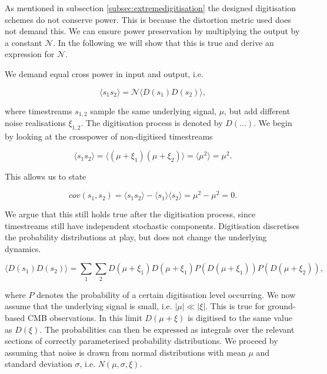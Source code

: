 \documentclass[apj]{emulateapj}
\begin{document}
As mentioned in subsection \ref{subsec:extremedigitisation} the designed digitisation schemes do not conserve power. This is because the distortion metric used does not demand this. We can ensure power preservation by multiplying the output by a constant $\mathcal{N}$. In the following we will show that this is true and derive an expression for $\mathcal{N}$.

We demand equal cross power in input and output, i.e.

\begin{equation} \label{eq:normcrosspower}
\langle s_1 s_2 \rangle = \mathcal{N} \langle D(s_1) D(s_2) \rangle,
\end{equation}

where timestreams $s_{1,2}$ sample the same underlying signal, $\mu$, but add different noise realisations $\xi_{1, 2}$. The digitisation process is denoted by $D(\dots)$. We begin by looking at the crosspower of non-digitised timestreams

\begin{equation}
\langle s_1 s_2 \rangle = \langle (\mu + \xi_1) (\mu + \xi_2) \rangle =  \langle \mu^2 \rangle = \mu^2.
\end{equation}

This allows us to state

\begin{equation}
cov(s_1, s_2) = \langle s_1 s_2 \rangle - \langle s_1 \rangle \langle s_2 \rangle = \mu^2 - \mu^2 = 0.
\end{equation}

We argue that this still holds true after the digitisation process, since timestreams still have independent stochastic components. Digitisation discretises the probability distributions at play, but does not change the underlying dynamics.

\begin{equation}
\langle D(s_1) D(s_2) \rangle = \sum_1 \sum_2 D(\mu + \xi_1) D(\mu + \xi_1) P(D(\mu + \xi_1)) P(D(\mu + \xi_2)),
\end{equation}

where $P$ denotes the probability of a certain digitisation level occurring. We now assume that the underlying signal is small, i.e. $| \mu | \ll | \xi |$. This is true for ground-based CMB observations. In this limit $D(\mu + \xi)$ is digitised to the same value as $D(\xi)$. The probabilities can then be expressed as integrals over the relevant sections of correctly parameterised probability distributions. We proceed by assuming that noise is drawn from normal distributions with mean $\mu$ and standard deviation $\sigma$, i.e. $N(\mu, \sigma, \xi)$.
\end{document}
